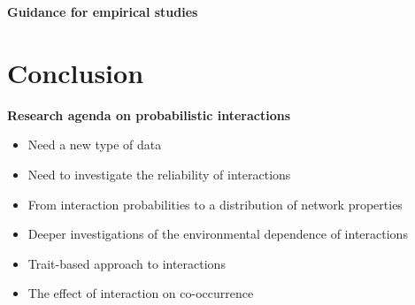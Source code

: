 \documentclass[12pt]{article}
\begin{document}
\textbf{Guidance for empirical studies}\\





\newpage




\section*{Conclusion}

\textbf{Research agenda on probabilistic interactions}\\
\begin{itemize}
	\item Need a new type of data
	\item Need to investigate the reliability of interactions
	\item From interaction probabilities to a distribution of network properties 
	\item Deeper investigations of the environmental dependence of interactions
	\item Trait-based approach to interactions
	\item The effect of interaction on co-occurrence
\end{itemize}
\end{document}
